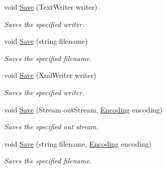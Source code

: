 \begin{DoxyCompactItemize}
void \hyperlink{class_html_agility_pack_1_1_html_document_a807a732ac65a41587c17bbb9effabd68}{Save} (Text\+Writer writer)
\begin{DoxyCompactList}\small\item\em Saves the specified writer. \end{DoxyCompactList}\item 
void \hyperlink{class_html_agility_pack_1_1_html_document_a5f1fa7de7fc1667c52aeb2bdd67e4a35}{Save} (string filename)
\begin{DoxyCompactList}\small\item\em Saves the specified filename. \end{DoxyCompactList}\item 
void \hyperlink{class_html_agility_pack_1_1_html_document_a604211ba10c90bad128eb9787ad75939}{Save} (Xml\+Writer writer)
\begin{DoxyCompactList}\small\item\em Saves the specified writer. \end{DoxyCompactList}\item 
void \hyperlink{class_html_agility_pack_1_1_html_document_a15de9d07bec41ccc6cfc6d73595d290b}{Save} (Stream out\+Stream, \hyperlink{class_html_agility_pack_1_1_html_document_a220bdf28a5e35f4898075084be2d59f0}{Encoding} encoding)
\begin{DoxyCompactList}\small\item\em Saves the specified out stream. \end{DoxyCompactList}\item 
void \hyperlink{class_html_agility_pack_1_1_html_document_afb3166f6dc7649e5ba93a13e44aeb3f2}{Save} (string filename, \hyperlink{class_html_agility_pack_1_1_html_document_a220bdf28a5e35f4898075084be2d59f0}{Encoding} encoding)
\begin{DoxyCompactList}\small\item\em Saves the specified filename. \end{DoxyCompactList}\end{DoxyCompactItemize}
